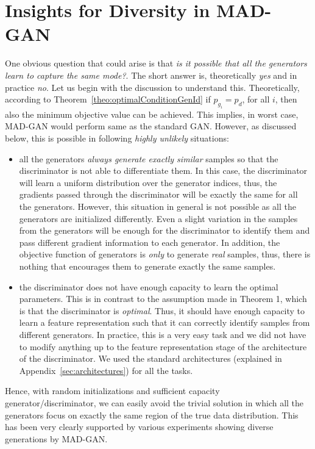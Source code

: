 \section{Insights for Diversity in MAD-GAN}
One obvious question that could arise is that {\em is it possible that all the generators learn to capture the same mode?}. The short answer is, theoretically {\em yes} and in practice {\em no}. Let us begin with the discussion to understand this. Theoretically, according to Theorem~\ref{theo:optimalConditionGenId} if $p_{g_i} = p_d$, for all $i$, then also the minimum objective value can be achieved. This implies, in worst case, MAD-GAN would perform same as the standard GAN. However, as discussed below, this is possible in following {\em highly unlikely} situations:
\begin{itemize}
	\item all the generators {\em always generate exactly similar} samples so that the discriminator is not able to differentiate them. In this case, the discriminator will learn a uniform distribution over the generator indices, thus, the gradients passed through the discriminator will be exactly the same for all the generators. However, this situation in general is not possible as all the generators are initialized differently. Even a slight variation in the samples from the generators will be enough for the discriminator to identify them and pass different gradient information to each generator. In addition, the objective function of generators is {\em only} to generate {\em real} samples, thus, there is nothing that encourages them to generate exactly the same samples. 
	\item the discriminator does not have enough capacity to learn the optimal parameters. This is in contrast to the assumption made in Theorem 1, which is that the discriminator is {\em optimal}. Thus, it should have enough capacity to learn a feature representation such that it can correctly identify samples from different generators. In practice, this is a very easy task and we did not have to modify anything up to the feature representation stage of the architecture of the discriminator. We used the standard architectures (explained in Appendix~\ref{sec:architectures}) for all the tasks. 
\end{itemize}
Hence, with random initializations and sufficient capacity generator/discriminator, we can easily avoid the trivial solution in which all the generators focus on exactly the same region of the true data distribution. This has been very clearly supported by various experiments showing diverse generations by MAD-GAN. 

